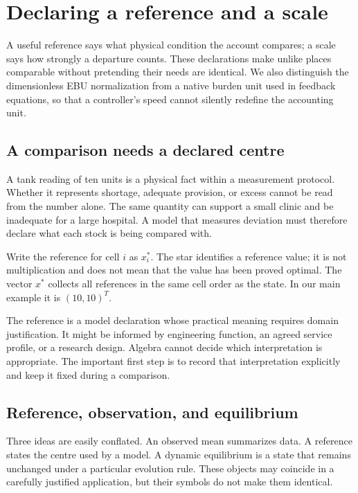 \chapter{Declaring a reference and a scale}\label{ch:reference}

A useful reference says what physical condition the account compares; a scale says how strongly a departure counts. These declarations make unlike places comparable without pretending their needs are identical. We also distinguish the dimensionless EBU normalization from a native burden unit used in feedback equations, so that a controller's speed cannot silently redefine the accounting unit.


\section{A comparison needs a declared centre}
A tank reading of ten units is a physical fact within a measurement protocol. Whether it represents shortage, adequate provision, or excess cannot be read from the number alone. The same quantity can support a small clinic and be inadequate for a large hospital. A model that measures deviation must therefore declare what each stock is being compared with.

Write the reference for cell \(i\) as \(x_i^*\). The star identifies a reference value; it is not multiplication and does not mean that the value has been proved optimal. The vector \(x^*\) collects all references in the same cell order as the state. In our main example it is \((10,10)^T\).

The reference is a model declaration whose practical meaning requires domain justification. It might be informed by engineering function, an agreed service profile, or a research design. Algebra cannot decide which interpretation is appropriate. The important first step is to record that interpretation explicitly and keep it fixed during a comparison.

\section{Reference, observation, and equilibrium}
Three ideas are easily conflated. An observed mean summarizes data. A reference states the centre used by a model. A dynamic equilibrium is a state that remains unchanged under a particular evolution rule. These objects may coincide in a carefully justified application, but their symbols do not make them identical.

